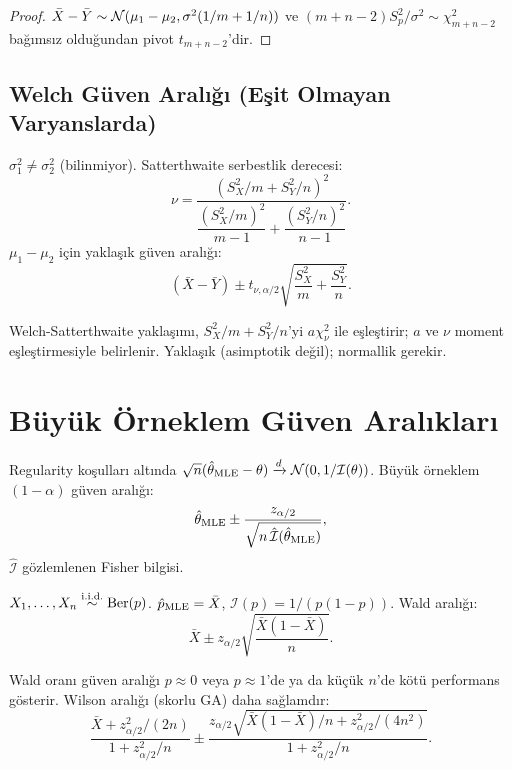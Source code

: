 \begin{proof}
$\bar{X}-\bar{Y}\sim\mathcal{N}(\mu_1-\mu_2,\sigma^2(1/m+1/n))$ ve $(m+n-2)S_p^2/\sigma^2\sim\chi^2_{m+n-2}$ bağımsız olduğundan pivot $t_{m+n-2}$'dir.
\end{proof}

\subsection{Welch Güven Aralığı (Eşit Olmayan Varyanslarda)}

\begin{teorem}\label{thm:welch}
$\sigma_1^2\neq\sigma_2^2$ (bilinmiyor). Satterthwaite serbestlik derecesi:
\[
  \nu = \frac{(S_X^2/m + S_Y^2/n)^2}{\dfrac{(S_X^2/m)^2}{m-1}+\dfrac{(S_Y^2/n)^2}{n-1}}.
\]
$\mu_1-\mu_2$ için yaklaşık güven aralığı:
\[
  (\bar{X}-\bar{Y}) \pm t_{\nu,\alpha/2}\!\sqrt{\frac{S_X^2}{m}+\frac{S_Y^2}{n}}.
\]
\end{teorem}

\begin{ispatiskele}
Welch-Satterthwaite yaklaşımı, $S_X^2/m+S_Y^2/n$'yi $a\chi^2_\nu$ ile eşleştirir; $a$ ve $\nu$ moment eşleştirmesiyle belirlenir. Yaklaşık (asimptotik değil); normallik gerekir.
\end{ispatiskele}

\section{Büyük Örneklem Güven Aralıkları}
\label{sec:buyuk_orneklem}

\begin{teorem}\label{thm:wald_ga}
Regularity koşulları altında $\sqrt{n}(\hat{\theta}_{\text{MLE}}-\theta)\xrightarrow{d}\mathcal{N}(0,1/\mathcal{I}(\theta))$. Büyük örneklem $(1-\alpha)$ güven aralığı:
\[
  \hat{\theta}_{\text{MLE}} \pm \frac{z_{\alpha/2}}{\sqrt{n\,\hat{\mathcal{I}}(\hat{\theta}_{\text{MLE}})}},
\]
$\hat{\mathcal{I}}$ gözlemlenen Fisher bilgisi.
\end{teorem}

\begin{ornek}\label{ex:oran_ga}
$X_1,\ldots,X_n\overset{\text{i.i.d.}}{\sim}\mathrm{Ber}(p)$. $\hat{p}_{\text{MLE}}=\bar{X}$, $\mathcal{I}(p)=1/(p(1-p))$. Wald aralığı:
\[
  \bar{X} \pm z_{\alpha/2}\sqrt{\frac{\bar{X}(1-\bar{X})}{n}}.
\]
\end{ornek}

\begin{hataanalizi}
Wald oranı güven aralığı $p\approx0$ veya $p\approx1$'de ya da küçük $n$'de kötü performans gösterir. Wilson aralığı (skorlu GA) daha sağlamdır:
\[
  \frac{\bar{X}+z_{\alpha/2}^2/(2n)}{1+z_{\alpha/2}^2/n} \pm \frac{z_{\alpha/2}\sqrt{\bar{X}(1-\bar{X})/n + z_{\alpha/2}^2/(4n^2)}}{1+z_{\alpha/2}^2/n}.
\]
\end{hataanalizi}

